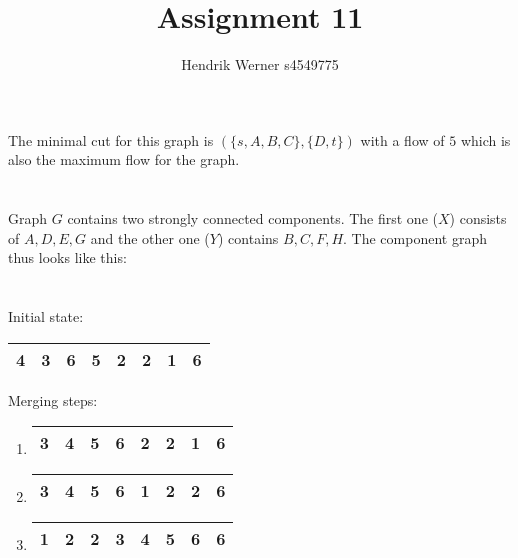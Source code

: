 \documentclass[12pt, a4paper]{article}
\title{Assignment 11}
\author{Hendrik Werner s4549775}
\begin{document}
\maketitle

\section{} %
The minimal cut for this graph is $(\{s, A, B, C\}, \{D, t\})$ with a flow of $5$ which is also the maximum flow for the graph.

\section{} %

\section{} %

Graph $G$ contains two strongly connected components. The first one ($X$) consists of $A, D, E, G$ and the other one ($Y$) contains $B, C, F, H$. The component graph thus looks like this:


\section{} %

Initial state:

\begin{tabular}{|c|c|c|c|c|c|c|c|}
	\hline
	4 & 3 & 6 & 5 & 2 & 2 & 1 & 6\\
	\hline
\end{tabular}

Merging steps:

\begin{enumerate}
	\item \begin{tabular}{|c|c|c|c|c|c|c|c|}
		\hline
		3 & 4 & 5 & 6 & 2 & 2 & 1 & 6\\
		\hline
	\end{tabular}
	\item \begin{tabular}{|c|c|c|c|c|c|c|c|}
		\hline
		3 & 4 & 5 & 6 & 1 & 2 & 2 & 6\\
		\hline
	\end{tabular}
	\item \begin{tabular}{|c|c|c|c|c|c|c|c|}
		\hline
		1 & 2 & 2 & 3 & 4 & 5 & 6 & 6\\
		\hline
	\end{tabular}
\end{enumerate}

\section{} %
\end{document}
